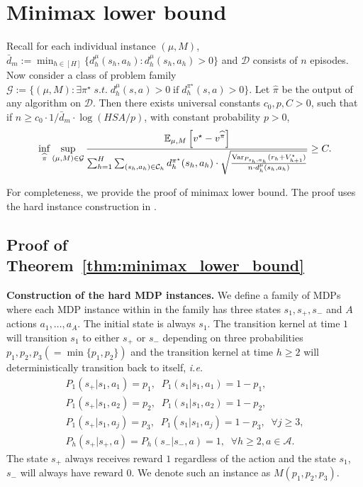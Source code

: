 \section{Minimax lower bound}\label{sec:minimax_lower}

\begin{theorem}\label{thm:minimax_lower_bound}
	Recall for each individual instance $(\mu,M)$, $\bar{d}_m:=\min_{h\in[H]}\{d^\mu_h(s_h,a_h):d^\mu_h(s_h,a_h)>0\}$ and $\mathcal{D}$ consists of $n$ episodes. Now consider a class of problem family $\mathcal{G}:=\{(\mu,M): \exists \pi^\star\;s.t. \; d^\mu_h(s,a)>0\;\text{if}\;d^{\pi^\star}_h(s,a)>0\}$. Let $\widehat{\pi}$ be the output of any algorithm on $\mathcal{D}$. Then there exists universal constants $c_0,p,C>0$, such that if $n\geq c_0 \cdot 1/\bar{d}_m\cdot\log(HSA/p)$, with constant probability $p>0$,
	\begin{equation}\label{eqn:minimax_lower}
	\inf_{\widehat{\pi}}\sup_{(\mu,M)\in\mathcal{G}}\frac{\mathbb{E}_{\mu,M}\left[v^\star-v^{\widehat{\pi}}\right]}{\sum_{h=1}^H\sum_{(s_h,a_h)\in\mathcal{C}_h}d^{\pi^\star}_h(s_h,a_h)\cdot\sqrt{\frac{\mathrm{Var}_{P_{s_h,a_h}}(r_h+V^\star_{h+1})}{ n\cdot d^\mu_h{(s_h,a_h)}}}}\geq C.
	\end{equation}
\end{theorem}


For completeness, we provide the proof of minimax lower bound. The proof uses the hard instance construction in \cite{jin2020pessimism}. 

\subsection{Proof of Theorem~\ref{thm:minimax_lower_bound}}

\textbf{Construction of the hard MDP instances.} We define a family of MDPs where each MDP instance within in the family has three states $s_1,s_+,s_-$ and $A$ actions $a_1,\ldots,a_A$. The initial state is always $s_1$. The transition kernel at time $1$ will transition $s_1$ to either $s_+$ or $s_-$ depending on three probabilities {$p_1,p_2,p_3(=\min\{p_1,p_2\})$} and the transition kernel at time $h\geq 2$ will deterministically transition back to itself, \emph{i.e.}
\begin{align*}
P_1(s_+|s_1,a_1)=p_1,\;\;P_1(s_1|s_1,a_1)=1-p_1,\\
P_1(s_+|s_1,a_2)=p_2,\;\;P_1(s_1|s_1,a_2)=1-p_2,\\
P_1(s_+|s_1,a_j)=p_3,\;\;P_1(s_1|s_1,a_j)=1-p_3,\;\;\forall j\geq 3,\\
P_h(s_+|s_+,a)=P_h(s_-|s_-,a)=1,\;\;\forall h\geq 2,a\in\mathcal{A}.
\end{align*}
The state $s_+$ always receives reward $1$ regardless of the action and the state $s_1$, $s_-$ will always have reward $0$. We denote such an instance as $M(p_1,p_2,p_3)$.


